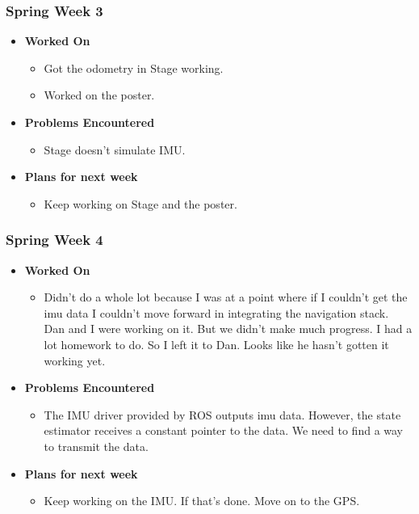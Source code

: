 \documentclass{article}
\begin{document}
\subsubsection{Spring Week 3}
\begin{itemize}
    \item {\textbf{Worked On}}
    \begin{itemize}
      \item Got the odometry in Stage working.
      \item Worked on the poster.
    \end{itemize}

    \item {\textbf{Problems Encountered}}
    \begin{itemize}
      \item Stage doesn't simulate IMU.
    \end{itemize}

    \item{\textbf{Plans for next week}}
    \begin{itemize}
      \item Keep working on Stage and the poster.
    \end{itemize}

\end{itemize}

\subsubsection{Spring Week 4}
\begin{itemize}
    \item {\textbf{Worked On}}
    \begin{itemize}
      \item Didn't do a whole lot because I was at a point where if I couldn't
      get the imu data I couldn't move forward in integrating the navigation
      stack. Dan and I were working on it. But we didn't make much progress.
      I had a lot homework to do. So I left it to Dan. Looks like he hasn't
      gotten it working yet.
    \end{itemize}

    \item {\textbf{Problems Encountered}}
    \begin{itemize}
      \item The IMU driver provided by ROS outputs imu data. However, the state
      estimator receives a constant pointer to the data. We need to find a way to
      transmit the data.
    \end{itemize}

    \item{\textbf{Plans for next week}}
    \begin{itemize}
      \item Keep working on the IMU. If that's done. Move on to the GPS.
    \end{itemize}

\end{itemize}
\end{document}
